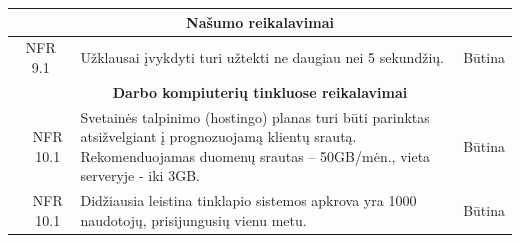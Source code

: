 \documentclass{VUMIFPSkursinis}
\begin{document}
\begin{table}[H]
\begin{tabular}{|p{1cm}|p{1cm}|p{}|p{}|}
		\hline
		\multicolumn{4}{|c|}{\bfseries Našumo reikalavimai}\\		
		
		\hline
		\multicolumn{2}{|c|}{NFR 9.1}&
		{Užklausai įvykdyti turi užtekti ne daugiau nei 5 sekundžių.
		}&
		\multicolumn{1}{c|}{Būtina}\\
		
		\hline
		\multicolumn{4}{|c|}{\bfseries Darbo kompiuterių tinkluose reikalavimai}\\		
		
		\hline
		\multicolumn{1}{|c}{}&
		\multicolumn{1}{c|}{NFR 10.1}&
		{Svetainės talpinimo (hostingo) planas turi būti parinktas atsižvelgiant į prognozuojamą klientų srautą. Rekomenduojamas duomenų srautas – 50GB/mėn., vieta serveryje - iki 3GB.
		}&
		\multicolumn{1}{c|}{Būtina}\\
		
		\hline
		\multicolumn{1}{|c}{}&
		\multicolumn{1}{c|}{NFR 10.1}&
		{Didžiausia leistina tinklapio sistemos apkrova yra 1000 naudotojų, prisijungusių vienu metu.
		}&
		\multicolumn{1}{c|}{Būtina}\\
		\hline
	\end{tabular}		
\end{table}
\end{document}
